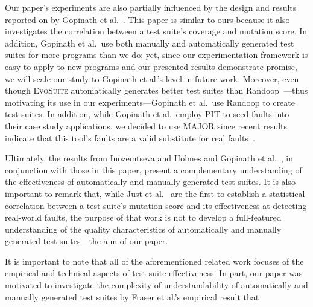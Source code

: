 Our paper's experiments are also partially influenced by the design and results reported on by Gopinath et al.~\cite{gopinath2014}.  This paper is similar to ours because it also investigates the correlation between a test suite's coverage and mutation score.  In addition, Gopinath et al.\ use both manually and automatically generated test suites for more programs than we do; yet, since our experimentation framework is easy to apply to new programs and our presented results demonstrate promise, we will scale our study to Gopinath et al.'s level in future work. Moreover, even though \textsc{EvoSuite} automatically generates better test suites than Randoop~\cite{fraser2013a}---thus motivating its use in our experiments---Gopinath et al.\ use Randoop to create test suites.  In addition, while Gopinath et al.\ employ PIT to seed faults into their case study applications, we decided to use MAJOR since recent results indicate that this tool's faults are a valid substitute for real faults~\cite{just2014}. 

Ultimately, the results from Inozemtseva and Holmes \cite{inozemtseva2014} and Gopinath et al.~\cite{gopinath2014}, in conjunction with those in this paper, present a complementary understanding of the effectiveness of automatically and manually generated test suites. It is also important to remark that, while Just et al.~\cite{just2014} are the first to establish a statistical correlation between a test suite's mutation score and its effectiveness at detecting real-world faults, the purpose of that work is not to develop a full-featured understanding of the quality characteristics of automatically and manually generated test suites---the aim of our paper.


It is important to note that all of the aforementioned related work focuses of the empirical and technical aspects of
test suite effectiveness.  In part, our paper was motivated to investigate the complexity of understandability of automatically
and manually generated test suites by Fraser et al.'s empirical result that 

